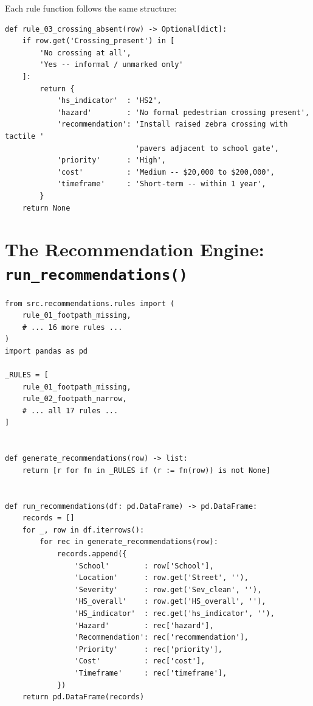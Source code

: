 \documentclass[11pt,a4paper,openany]{book}
\begin{document}
Each rule function follows the same structure:

\begin{lstlisting}[style=python, caption={Example rule (rule\_03) from rules.py.}]
def rule_03_crossing_absent(row) -> Optional[dict]:
    if row.get('Crossing_present') in [
        'No crossing at all',
        'Yes -- informal / unmarked only'
    ]:
        return {
            'hs_indicator'  : 'HS2',
            'hazard'        : 'No formal pedestrian crossing present',
            'recommendation': 'Install raised zebra crossing with tactile '
                              'pavers adjacent to school gate',
            'priority'      : 'High',
            'cost'          : 'Medium -- $20,000 to $200,000',
            'timeframe'     : 'Short-term -- within 1 year',
        }
    return None
\end{lstlisting}

\section{The Recommendation Engine: \texttt{run\_recommendations()}}

\begin{lstlisting}[style=python, caption={Full source: src/recommendations/engine.py.}]
from src.recommendations.rules import (
    rule_01_footpath_missing,
    # ... 16 more rules ...
)
import pandas as pd

_RULES = [
    rule_01_footpath_missing,
    rule_02_footpath_narrow,
    # ... all 17 rules ...
]


def generate_recommendations(row) -> list:
    return [r for fn in _RULES if (r := fn(row)) is not None]


def run_recommendations(df: pd.DataFrame) -> pd.DataFrame:
    records = []
    for _, row in df.iterrows():
        for rec in generate_recommendations(row):
            records.append({
                'School'        : row['School'],
                'Location'      : row.get('Street', ''),
                'Severity'      : row.get('Sev_clean', ''),
                'HS_overall'    : row.get('HS_overall', ''),
                'HS_indicator'  : rec.get('hs_indicator', ''),
                'Hazard'        : rec['hazard'],
                'Recommendation': rec['recommendation'],
                'Priority'      : rec['priority'],
                'Cost'          : rec['cost'],
                'Timeframe'     : rec['timeframe'],
            })
    return pd.DataFrame(records)
\end{lstlisting}
\end{document}
